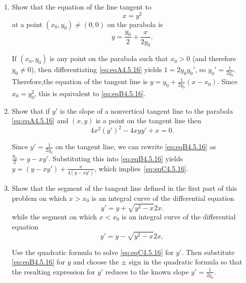 \documentclass{ximera}
\begin{document}
\begin{problem}\label{exer:4.5.16}
\begin{enumerate}
\item %
Show that the equation of the line tangent to  \begin{equation}\label{eq:eqA4.5.16}
x=y^2
\end{equation}
at a point $(x_0,y_0)\ne(0,0)$  on the parabola is
\begin{equation}\label{eq:eqB4.5.16}
y=\frac{y_0}{2}+\frac{x}{2y_0}.
\end{equation}

\begin{solution}
If $(x_0,y_0)$ is any point on the parabola such that
$x_0>0$ (and therefore $y_0\ne0$), then differentiating \ref{eq:eqA4.5.16} yields
$1=2y_0y_0'$, so $y_0'=\frac{1}{2y_0}$. Therefore,the equation of
the tangent line is $y=y_0+\frac{1}{2y_0}(x-x_0)$. Since
$x_0=y_0^2$, this is equivalent to \ref{eq:eqB4.5.16}.
\end{solution}


\item %
Show that if $y'$ is the slope of a nonvertical tangent line
to the parabola \ref{eq:eqA4.5.16} and $(x,y)$ is a point on the tangent
line then
\begin{equation}\label{eq:eqC4.5.16}
4x^2(y')^2-4xyy'+x=0.
\end{equation}

\begin{solution}
Since $y'=\frac{1}{2y_0}$ on the tangent line, we can rewrite \ref{eq:eqB4.5.16} as
$\frac{y_0}{2}=y-xy'$. Substituting this into \ref{eq:eqB4.5.16} yields
$y=(y-xy')+\frac{x}{4(y-xy')}$, which implies~\ref{eq:eqC4.5.16}.
\end{solution}


\item %
Show that the segment of the tangent line defined in the first part of this problem on which
$x>x_0$ is an integral curve of the differential equation
\begin{equation}\label{eq:eqD4.5.16}
y'={y+\sqrt{y^2-x}}{2x}.
\end{equation}
while the segment on which $x<x_0$ is an integral curve of the
differential equation
\begin{equation}\label{eq:eqE4.5.16}
y'={y-\sqrt{y^2-x}}{2x},
\end{equation}
\begin{hint}
    Use the quadratic formula to solve \ref{eq:eqC4.5.16} for $y'$. Then
substitute \ref{eq:eqB4.5.16} for $y$ and choose the $\pm$ sign in the
quadratic formula so that the resulting expression for $y'$ reduces to
the known slope $y'=\frac{1}{2y_0}$.
\end{hint}


\end{enumerate}
\end{problem}
\end{document}
